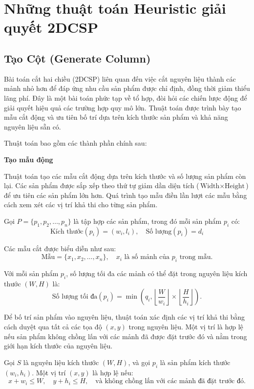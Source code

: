 \section{Những thuật toán Heuristic giải quyết 2DCSP}
\subsection{Tạo Cột (Generate Column)}

\hspace{0.5cm}Bài toán cắt hai chiều (2DCSP) liên quan đến việc cắt nguyên liệu thành các mảnh nhỏ hơn để đáp ứng nhu cầu sản phẩm được chỉ định, đồng thời giảm thiểu lãng phí. Đây là một bài toán phức tạp về tổ hợp, đòi hỏi các chiến lược động để giải quyết hiệu quả các trường hợp quy mô lớn. Thuật toán được trình bày tạo mẫu cắt động và ưu tiên bố trí dựa trên kích thước sản phẩm và khả năng nguyên liệu sẵn có.

Thuật toán bao gồm các thành phần chính sau:

\textbf{Tạo mẫu động}

Thuật toán tạo các mẫu cắt động dựa trên kích thước và số lượng sản phẩm còn lại. Các sản phẩm được sắp xếp theo thứ tự giảm dần diện tích (\( \text{Width} \times \text{Height} \)) để ưu tiên các sản phẩm lớn hơn. Quá trình tạo mẫu điền lần lượt các mẫu bằng cách xem xét các vị trí khả thi cho từng sản phẩm.

Gọi \( P = \{p_1, p_2, \dots, p_n\} \) là tập hợp các sản phẩm, trong đó mỗi sản phẩm \( p_i \) có:
\[
\text{Kích thước}(p_i) = (w_i, l_i), \quad \text{Số lượng}(p_i) = d_i
\]

Các mẫu cắt được biểu diễn như sau:
\[
\text{Mẫu} = \{x_1, x_2, \dots, x_n\}, \quad x_i \text{ là số mảnh của } p_i \text{ trong mẫu}.
\]

Với mỗi sản phẩm \( p_i \), số lượng tối đa các mảnh có thể đặt trong nguyên liệu kích thước \( (W, H) \) là:
\[
\text{Số lượng tối đa}(p_i) = \min\left(q_i, \left\lfloor \frac{W}{w_i} \right\rfloor \times \left\lfloor \frac{H}{h_i} \right\rfloor\right).
\]

Để bố trí sản phẩm vào nguyên liệu, thuật toán xác định các vị trí khả thi bằng cách duyệt qua tất cả các tọa độ \( (x, y) \) trong nguyên liệu. Một vị trí là hợp lệ nếu sản phẩm không chồng lấn với các mảnh đã được đặt trước đó và nằm trong giới hạn kích thước của nguyên liệu.

Gọi \( S \) là nguyên liệu kích thước \( (W, H) \), và gọi \( p_i \) là sản phẩm kích thước \( (w_i, h_i) \). Một vị trí \( (x, y) \) là hợp lệ nếu:
\[
x + w_i \leq W, \quad y + h_i \leq H, \quad \text{và không chồng lấn với các mảnh đã đặt trước đó}.
\]

